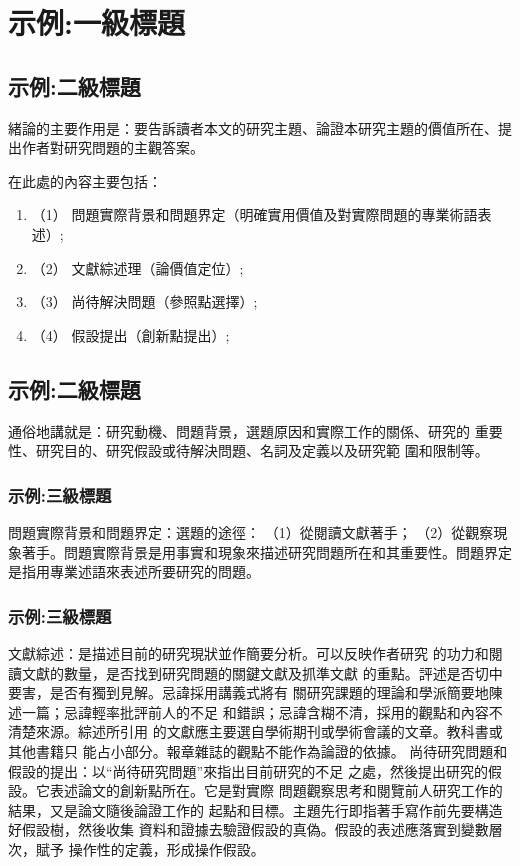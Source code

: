 \section{示例:一級標題}
\subsection{示例:二級標題}
緒論的主要作用是：要告訴讀者本文的研究主題、論證本研究主題的價值所在、提出作者對研究問題的主觀答案。

\par 在此處的內容主要包括：
\begin{enumerate}
	\item[] （1） 問題實際背景和問題界定（明確實用價值及對實際問題的專業術語表述）;
	\item[] （2） 文獻綜述理（論價值定位）;
	\item[]	（3） 尚待解決問題（參照點選擇）;
	\item[] （4） 假設提出（創新點提出）;
\end{enumerate}


\subsection{示例:二級標題}
\par 通俗地講就是：研究動機、問題背景，選題原因和實際工作的關係、研究的
重要性、研究目的、研究假設或待解決問題、名詞及定義以及研究範
圍和限制等。

\subsubsection{示例:三級標題}
\par  問題實際背景和問題界定：選題的途徑：
（1）從閱讀文獻著手；
（2）從觀察現象著手。問題實際背景是用事實和現象來描述研究問題所在和其重要性。問題界定是指用專業述語來表述所要研究的問題。
\clearpage

\subsubsection{示例:三級標題}
\par 文獻綜述：是描述目前的研究現狀並作簡要分析。可以反映作者研究
的功力和閱讀文獻的數量，是否找到研究問題的關鍵文獻及抓準文獻
的重點。評述是否切中要害，是否有獨到見解。忌諱採用講義式將有
關研究課題的理論和學派簡要地陳述一篇；忌諱輕率批評前人的不足
和錯誤；忌諱含糊不清，採用的觀點和內容不清楚來源。綜述所引用
的文獻應主要選自學術期刊或學術會議的文章。教科書或其他書籍只
能占小部分。報章雜誌的觀點不能作為論證的依據。
尚待研究問題和假設的提出：以“尚待研究問題”來指出目前研究的不足
之處，然後提出研究的假設。它表述論文的創新點所在。它是對實際
問題觀察思考和閱覽前人研究工作的結果，又是論文隨後論證工作的
起點和目標。主題先行即指著手寫作前先要構造好假設樹，然後收集
資料和證據去驗證假設的真偽。假設的表述應落實到變數層次，賦予
操作性的定義，形成操作假設。



